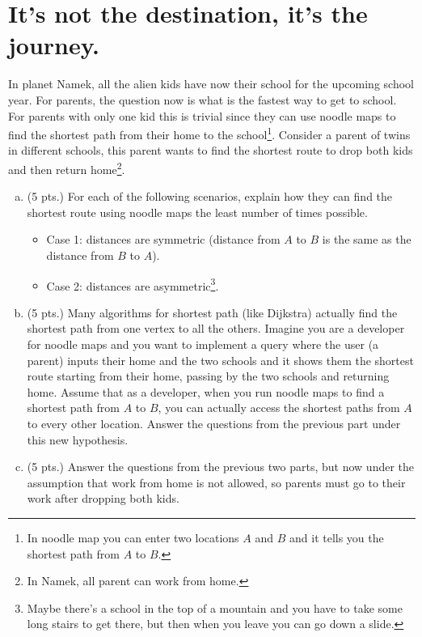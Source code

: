 \documentclass[letterpaper,11pt]{article}
\theoremstyle{plain}
\theoremstyle{definition}
\begin{document}
\newpage
\section{It's not the destination, it's the journey.}
In planet Namek, all the alien kids have now their school for the upcoming school year. For parents, the question now is what is the fastest way to get to school. For parents with only one kid this is trivial since they can use noodle maps to find the shortest path from their home to the school\footnote{In noodle map you can enter two locations $A$ and $B$ and it tells you the shortest path from $A$ to $B$.}. Consider a parent of twins in different schools, this parent wants to find the shortest route to drop both kids and then return home\footnote{In Namek, all parent can work from home.}. 
\begin{enumerate}[a)]
\item (5 pts.) For each of the following scenarios, explain how they can find the shortest route using noodle maps the least number of times possible.
\begin{itemize}
    \item Case 1: distances are symmetric (distance from $A$ to $B$ is the same as the distance from $B$ to $A$).
    \item Case 2: distances are asymmetric\footnote{Maybe there's a school in the top of a mountain and you have to take some long stairs to get there, but then when you leave you can go down a slide.}. \\

\end{itemize}
\item (5 pts.) Many algorithms for shortest path (like Dijkstra) actually find the shortest path from one vertex to all the others. Imagine you are a developer for noodle maps and you want to implement a query where the user (a parent) inputs their home and the two schools and it shows them the shortest route starting from their home, passing by the two schools and returning home. Assume that as a developer, when you run noodle maps to find a shortest path from $A$ to $B$, you can actually access the shortest paths from $A$ to every other location. Answer the questions from the previous part under this new hypothesis. \\

\item (5 pts.) Answer the questions from the previous two parts, but now under the assumption that work from home is not allowed, so parents must go to their work after dropping both kids.
\end{enumerate}
\end{document}
